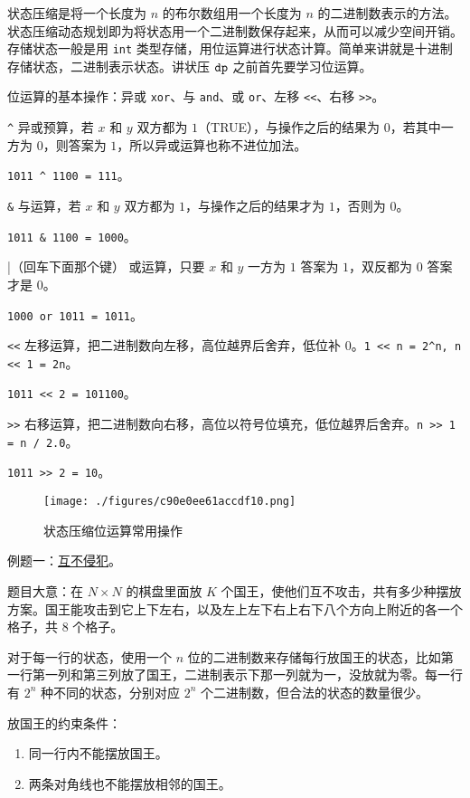 
状态压缩是将一个长度为 $n$ 的布尔数组用一个长度为 $n$ 的二进制数表示的方法。状态压缩动态规划即为将状态用一个二进制数保存起来，从而可以减少空间开销。存储状态一般是用 \verb|int| 类型存储，用位运算进行状态计算。简单来讲就是十进制存储状态，二进制表示状态。讲状压 $\tt dp$ 之前首先要学习位运算。

位运算的基本操作：异或 \verb|xor|、与 \verb|and|、或 \verb|or|、左移 \verb|<<|、右移 \verb|>>|。

\verb|^| 异或预算，若 $x$ 和 $y$ 双方都为 $1$（TRUE），与操作之后的结果为 $0$，若其中一方为 $0$，则答案为 $1$，所以异或运算也称不进位加法。

\verb|1011 ^ 1100 = 111|。

\verb|&| 与运算，若 $x$ 和 $y$ 双方都为 $1$，与操作之后的结果才为 $1$，否则为 $0$。

\verb|1011 & 1100 = 1000|。

|（回车下面那个键） 或运算，只要 $x$ 和 $y$ 一方为 $1$ 答案为 $1$，双反都为 $0$ 答案才是 $0$。

\verb|1000 or 1011 = 1011|。

\verb|<<| 左移运算，把二进制数向左移，高位越界后舍弃，低位补 $0$。\verb|1 << n = 2^n, n << 1 = 2n|。

\verb|1011 << 2 = 101100|。

\verb|>>| 右移运算，把二进制数向右移，高位以符号位填充，低位越界后舍弃。\verb|n >> 1 = n / 2.0|。

\verb|1011 >> 2 = 10|。

\begin{figure}[ht]
\centering
\texttt{[image: ./figures/c90e0ee61accdf10.png]}
\caption{状态压缩位运算常用操作} \label{fig_dp4_1}
\end{figure}

例题一：\href{https://loj.ac/p/2153}{互不侵犯}。

题目大意：在 $N \times N$ 的棋盘里面放 $K$ 个国王，使他们互不攻击，共有多少种摆放方案。国王能攻击到它上下左右，以及左上左下右上右下八个方向上附近的各一个格子，共 $8$ 个格子。

对于每一行的状态，使用一个 $n$ 位的二进制数来存储每行放国王的状态，比如第一行第一列和第三列放了国王，二进制表示下那一列就为一，没放就为零。每一行有 $2^n$ 种不同的状态，分别对应 $2^n$ 个二进制数，但合法的状态的数量很少。

放国王的约束条件：
\begin{enumerate}
\item 同一行内不能摆放国王。
\item 两条对角线也不能摆放相邻的国王。
\end{enumerate}

